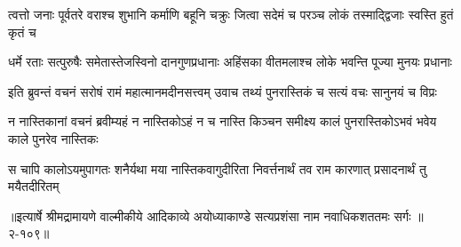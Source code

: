 \twolineshloka
{त्वत्तो जनाः पूर्वतरे वराश्च शुभानि कर्माणि बहूनि चक्रुः}
{जित्वा सदेमं च परञ्च लोकं तस्माद्द्विजाः स्वस्ति हुतं कृतं च} %

\twolineshloka
{धर्मे रताः सत्पुरुषैः समेतास्तेजस्विनो दानगुणप्रधानाः}
{अहिंसका वीतमलाश्च लोके भवन्ति पूज्या मुनयः प्रधानाः} %

\twolineshloka
{इति ब्रुवन्तं वचनं सरोषं रामं महात्मानमदीनसत्त्वम्}
{उवाच तथ्यं पुनरास्तिकं च सत्यं वचः सानुनयं च विप्रः} %

\twolineshloka
{न नास्तिकानां वचनं ब्रवीम्यहं न नास्तिकोऽहं न च नास्ति किञ्चन}
{समीक्ष्य कालं पुनरास्तिकोऽभवं भवेय काले पुनरेव नास्तिकः} %

\twolineshloka
{स चापि कालोऽयमुपागतः शनैर्यथा मया नास्तिकवागुदीरिता}
{निवर्त्तनार्थं तव राम कारणात् प्रसादनार्थं तु मयैतदीरितम्} %


॥इत्यार्षे श्रीमद्रामायणे वाल्मीकीये आदिकाव्ये अयोध्याकाण्डे सत्यप्रशंसा नाम नवाधिकशततमः सर्गः ॥२-१०९॥
